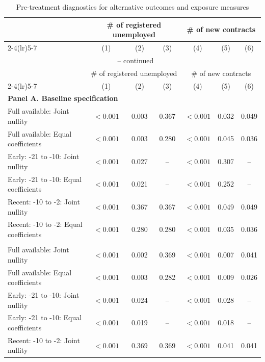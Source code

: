 \begingroup
\scriptsize
\renewcommand{\arraystretch}{0.88}
\setlength{\tabcolsep}{2.0pt}
\begin{longtable}{@{}lcccccc@{}}
\caption{Pre-treatment diagnostics for alternative outcomes and exposure measures}\label{tab:v1_robustness_pretrends}\\
\toprule
& \multicolumn{3}{c}{\# of registered unemployed} & \multicolumn{3}{c}{\# of new contracts} \\
\cmidrule(lr){2-4}\cmidrule(lr){5-7}
& (1) & (2) & (3) & (4) & (5) & (6) \\
\midrule
\endfirsthead
\multicolumn{7}{c}{\tablename\ \thetable{} -- continued} \\
\toprule
& \multicolumn{3}{c}{\# of registered unemployed} & \multicolumn{3}{c}{\# of new contracts} \\
\cmidrule(lr){2-4}\cmidrule(lr){5-7}
& (1) & (2) & (3) & (4) & (5) & (6) \\
\midrule
\endhead
\multicolumn{7}{l}{\textbf{Panel A. Baseline specification}} \\
Full available: Joint nullity & $<0.001$ & 0.003 & 0.367 & $<0.001$ & 0.032 & 0.049 \\
Full available: Equal coefficients & $<0.001$ & 0.003 & 0.280 & $<0.001$ & 0.045 & 0.036 \\
Early: -21 to -10: Joint nullity & $<0.001$ & 0.027 & -- & $<0.001$ & 0.307 & -- \\
Early: -21 to -10: Equal coefficients & $<0.001$ & 0.021 & -- & $<0.001$ & 0.252 & -- \\
Recent: -10 to -2: Joint nullity & $<0.001$ & 0.367 & 0.367 & $<0.001$ & 0.049 & 0.049 \\
Recent: -10 to -2: Equal coefficients & $<0.001$ & 0.280 & 0.280 & $<0.001$ & 0.035 & 0.036 \\
\addlinespace[5pt]
\multicolumn{7}{l}{\textbf{Panel B. Alternative outcomes: log(Y+1)}} \\
Full available: Joint nullity & $<0.001$ & 0.002 & 0.369 & $<0.001$ & 0.007 & 0.041 \\
Full available: Equal coefficients & $<0.001$ & 0.003 & 0.282 & $<0.001$ & 0.009 & 0.026 \\
Early: -21 to -10: Joint nullity & $<0.001$ & 0.024 & -- & $<0.001$ & 0.028 & -- \\
Early: -21 to -10: Equal coefficients & $<0.001$ & 0.019 & -- & $<0.001$ & 0.018 & -- \\
Recent: -10 to -2: Joint nullity & $<0.001$ & 0.369 & 0.369 & $<0.001$ & 0.041 & 0.041 \\

\end{longtable}
